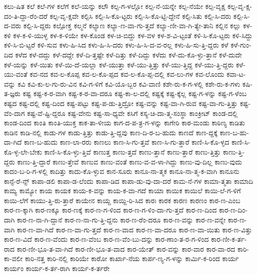 {ಕಲು-ಷಿತ
ಕಲೆ
ಕಲೆ-ಗಳ
ಕಲೆಗೆ
ಕಲೆ-ಯನ್ನು
ಕಲೌ
ಕಲ್ಪ-ಗ-ಳಲ್ಲೋ
ಕಲ್ಪ-ನೆ-ಯನ್ನೇ
ಕಲ್ಪ-ನೆಯೇ
ಕಲ್ಪ-ವೃಕ್ಷ
ಕಲ್ಪ-ವೃ-ಕ್ಷ-ದಂ-ತಿ-ದ್ದಾ-ರೆಂ-ದರೆ
ಕಲ್ಪ-ವೃ-ಕ್ಷವೇ
ಕಲ್ಪಿಸಿ
ಕಲ್ಪಿ-ಸಿ-ಕೊ-ಟ್ಟರು
ಕಲ್ಪಿ-ಸಿ-ಕೊ-ಟ್ಟಿ-ದ್ದೇನೆ
ಕಲ್ಪಿ-ಸಿತು
ಕಲ್ಪಿ-ಸಿ-ದರು
ಕಲ್ಪಿ-ಸಿ-ದ-ವರು
ಕಲ್ಪಿ-ಸಿ-ದ್ದರು
ಕಲ್ಪೋಕ್ತ
ಕಲ್ಮನೆ
ಕಲ್ಯಾಣ
ಕಲ್ಯಾ-ಣ-ವಾ-ಗು-ತ್ತದೆ
ಕಲ್ಯಾ-ಣೀ-ವಾ-ಗಿ-ತ್ಯೇ-ತಾನಿ
ಕಲ್ಲಿನ
ಕಲ್ಲು
ಕಳ-ಕಳಿ
ಕಳ-ಕ-ಳಿ-ಯುಳ್ಳ
ಕಳ-ಕ-ಳಿಯೇ
ಕಳ-ಕೊಂಡ
ಕಳ-ಚಿ-ಬಿದ್ದು
ಕಳ-ವಳ
ಕಳ-ಶ-ವಿ-ಟ್ಟಂತೆ
ಕಳಿ-ಸಿ-ಕೊ-ಟ್ಟರು
ಕಳಿ-ಸಿದ್ದು
ಕಳಿ-ಸಿ-ಬಿ-ಟ್ಟರೆ
ಕಳಿ-ಸುವ
ಕಳು-ಹಿ-ಸಿದ
ಕಳು-ಹಿ-ಸಿ-ದರು
ಕಳು-ಹಿ-ಸಿ-ದ-ವ-ರಲ್ಲ
ಕಳು-ಹಿ-ಸು-ತ್ತಿ-ದ್ದರು
ಕಳೆ
ಕಳೆ-ಗುಂ-ದಿದ
ಕಳೆದ
ಕಳೆ-ದದ್ದು
ಕಳೆ-ದದ್ದೇ
ಕಳೆ-ದಿ-ತ್ತಷ್ಟೇ
ಕಳೆ-ದಿತ್ತು
ಕಳೆ-ದಿದ್ದು
ಕಳೆದು
ಕಳೆ-ದು-ಕೊ-ಳ್ಳು-ತ್ತಾನೆ
ಕಳೆ-ದುದೇ
ಕಳೆ-ಯನ್ನು
ಕಳೆ-ಯಿತು
ಕಳೆ-ಯಿ-ದೆ-ಯಲ್ಲಾ
ಕಳೆ-ಯುತ್ತಾ
ಕಳೆ-ಯು-ತ್ತಿತ್ತು
ಕಳೆ-ಯು-ತ್ತಿದ್ದ
ಕಳೆ-ಯು-ತ್ತಿ-ದ್ದರು
ಕಳೆ-ಯು-ವಂತೆ
ಕವ-ನದ
ಕವ-ಲ-ಕೊಪ್ಪ
ಕವ-ಲ-ಕೊ-ಪ್ಪದ
ಕವ-ಲ-ಕೊ-ಪ್ಪ-ದಲ್ಲಿ
ಕವ-ಲು-ಗಳ
ಕವ-ಲೊಂದು
ಕವಾ-ಟ-ವನ್ನು
ಕವಿ
ಕವಿ-ಕು-ಲ-ಗು-ರು-ವಿನ
ಕವಿ-ಗ-ಳಿಗೆ
ಕವಿ-ಯೊ-ಬ್ಬರ
ಕವಿ-ವಾಣಿ
ಕಶೇ-ರು-ಕ-ಗ-ಳಲ್ಲಿ
ಕಶೇ-ರು-ಕ-ಗಳು
ಕಷಿ-ತ-ಜ್ಞರು
ಕಷ್ಟ
ಕಷ್ಟ-ಕ-ರ-ವಾಗಿ
ಕಷ್ಟ-ಕ-ರ-ವಾ-ದರೂ
ಕಷ್ಟ-ಕಾ-ಲ-ದಲ್ಲಿ
ಕಷ್ಟಕ್ಕೆ
ಕಷ್ಟ-ಕ್ಕೆಲ್ಲ
ಕಷ್ಟ-ಗ-ಳನ್ನು
ಕಷ್ಟ-ಗ-ಳೆಂಬ
ಕಷ್ಟದ
ಕಷ್ಟ-ದಲ್ಲಿ
ಕಷ್ಟ-ದಿಂದ
ಕಷ್ಟ-ಪಟ್ಟು
ಕಷ್ಟ-ಪ-ಡು-ತ್ತಿದ್ರೋ
ಕಷ್ಟ-ವನ್ನು
ಕಷ್ಟ-ವಾ-ಗಿ-ರುವ
ಕಷ್ಟ-ವಾ-ಗು-ತ್ತಿತ್ತು
ಕಷ್ಟ-ವೆಂ-ದಾಗ
ಕಷ್ಟ-ವೆ-ಷ್ಟಿ-ದ್ದರೂ
ಕಷ್ಟ-ವೇನು
ಕಷ್ಟ-ಸಾ-ಧ್ಯವೇ
ಕಸಿಗೆ
ಕಸ್ಯ-ಚಿ-ದಾ-ತ್ಮ-ಸಂಸ್ಥಾ
ಕಾಂಕ್ರೀಟ್
ಕಾಂಡ-ದಲ್ಲಿ
ಕಾಂಡ-ದಿಂದ
ಕಾಂತಿ
ಕಾಂತಿ-ಯುಕ್ತ
ಕಾಕ-ತಾ-ಳೀಯ
ಕಾಗ-ದ-ಪ-ತ್ರ-ಗ-ಳನ್ನು
ಕಾಗೇರಿ
ಕಾಠ-ಮಂಡು
ಕಾಠಿಣ್ಯ
ಕಾಡಿತು
ಕಾಡಿನ
ಕಾಡಿ-ನಲ್ಲಿ
ಕಾಡು-ಗಳ
ಕಾಡು-ತ್ತಿತ್ತು
ಕಾಡು-ತ್ತಿ-ದ್ದವು
ಕಾಣ-ದಿ-ರ-ಬ-ಹುದು
ಕಾಣದೆ
ಕಾಣ-ದ್ದಕ್ಕೆ
ಕಾಣ-ಬ-ಹು-ದಾ-ಗಿದೆ
ಕಾಣ-ಬ-ಹುದು
ಕಾಣ-ಲಾ-ರರು
ಕಾಣಲು
ಕಾಣ-ಸಿ-ಗು-ತ್ತವೆ
ಕಾಣ-ಸಿ-ಗು-ತ್ತಾರೆ
ಕಾಣಿ-ಸಿ-ಕೊ-ಳ್ಳದ
ಕಾಣಿ-ಸಿ-ಕೊ-ಳ್ಳ-ಲೇ-ಬೇಕು
ಕಾಣಿ-ಸಿ-ಕೊ-ಳ್ಳು-ತ್ತಿವೆ
ಕಾಣುತ್ತ
ಕಾಣು-ತ್ತದೆ
ಕಾಣು-ತ್ತಾನೆ
ಕಾಣು-ತ್ತಾರೆ
ಕಾಣು-ತ್ತಿತ್ತು
ಕಾಣು-ತ್ತಿ-ದ್ದರು
ಕಾಣು-ತ್ತಿ-ದ್ದಾರೆ
ಕಾಣು-ತ್ತೇವೆ
ಕಾಣುವ
ಕಾಣು-ವಂತೆ
ಕಾಣು-ವ-ವ-ಳಾ-ಗಿದ್ದು
ಕಾಣು-ವು-ದಿಲ್ಲ
ಕಾಣು-ವುದು
ಕಾದಂ-ಬ-ರಿ-ಗ-ಳಲ್ಲಿ
ಕಾದಿತ್ತು
ಕಾದು-ಕೊ-ಳ್ಳುವ
ಕಾನ-ಸೂರು
ಕಾನೂ-ನಾ-ತ್ಮಕ
ಕಾನೂ-ನಾ-ತ್ಮ-ಕ-ವಾಗಿ
ಕಾನೂನು
ಕಾನ್ಫೆ-ರೆ-ನ್ಸ್
ಕಾಪಾ-ಡಲಿ
ಕಾಪಾ-ಡ-ಲೆಂದು
ಕಾಪಾ-ಡಿದ
ಕಾಪಾ-ಡು-ವು-ದಾ-ದರೆ
ಕಾಮ-ನೆ-ಗಳ
ಕಾಮಾ-ತ್ಮತಾ
ಕಾಮಾದಿ
ಕಾಮ್ಯ
ಕಾಮ್ಯೋ
ಕಾಯ
ಕಾಯಕ
ಕಾಯ-ಕ-ವನ್ನು
ಕಾಯ-ಕ-ವಾ-ಗದೆ
ಕಾಯಾ
ಕಾಯಿಕ
ಕಾಯಿಲೆ
ಕಾಯಿ-ಲೆ-ಗ-ಳಿಗೆ
ಕಾಯಿ-ಲೆಗೆ
ಕಾಯು-ತ್ತಿ-ರು-ತ್ತಾರೆ
ಕಾಯೇನ
ಕಾಯ್ದ
ಕಾಯ್ದಿ-ರಿ-ಸಿದ
ಕಾರಃ
ಕಾರಕ
ಕಾರಣ
ಕಾರಣಂ
ಕಾರ-ಣ-ಎಂಬ
ಕಾರ-ಣ-ಕ್ಕಾಗಿ
ಕಾರ-ಣಕ್ಕೂ
ಕಾರ-ಣಕ್ಕೆ
ಕಾರ-ಣ-ಗ-ಳಿಂದ
ಕಾರ-ಣ-ಗ-ಳಿಂ-ದಾ-ಗು-ತ್ತದೆ
ಕಾರ-ಣ-ದಿಂದ
ಕಾರ-ಣ-ದಿಂ-ದಾಗಿ
ಕಾರ-ಣ-ನಾ-ಗಿ-ದ್ದಾನೆ
ಕಾರ-ಣ-ನಾ-ಗು-ತ್ತಿ-ದ್ದನು
ಕಾರ-ಣ-ರೆಂ-ದರೂ
ಕಾರ-ಣ-ವನ್ನು
ಕಾರ-ಣ-ವನ್ನೇ
ಕಾರ-ಣ-ವಾಗಿ
ಕಾರ-ಣ-ವಾ-ಗಿದೆ
ಕಾರ-ಣ-ವಾ-ಗು-ತ್ತದೆ
ಕಾರ-ಣ-ವಾದ
ಕಾರ-ಣ-ವಾ-ದರೂ
ಕಾರ-ಣ-ವಾ-ಯಿತು
ಕಾರ-ಣ-ವಿತ್ತು
ಕಾರ-ಣ-ವಿದೆ
ಕಾರ-ಣ-ವೆಂದು
ಕಾರ-ಣ-ವೆಂಬ
ಕಾರ-ಣ-ವೆಂ-ಬು-ದನ್ನು
ಕಾರ-ಣಾಂ-ತ-ರ-ಗ-ಳಿಂದ
ಕಾರ-ಣೀ-ಕ-ರ್ತ-ರಾದ
ಕಾರ-ಣೀ-ಭೂ-ತ-ವಾ-ಗಿದೆ
ಕಾರ-ಣೀ-ಭೂ-ತ-ವಾದ
ಕಾರ-ಯೇತ್
ಕಾರ-ವನ್ನು
ಕಾರ-ವಾರ
ಕಾರ-ವಾ-ರದ
ಕಾರಿ-ಕಾ-ವಲೀ
ಕಾರಿ-ನತ್ತ
ಕಾರಿ-ನಲ್ಲಿ
ಕಾರಿಯೇ
ಕಾರೋ
ಕಾರ್ಖಾ-ನೆಯ
ಕಾರ್ಪ-ಣ್ಯ-ಗ-ಳನ್ನು
ಕಾರ್ಮಿ-ಕ-ರಿಂದ
ಕಾರ್ಯ
ಕಾರ್ಯಂ
ಕಾರ್ಯ-ಕ-ರ್ತ-ರಾಗಿ
ಕಾರ್ಯ-ಕ-ರ್ತರೇ
}
